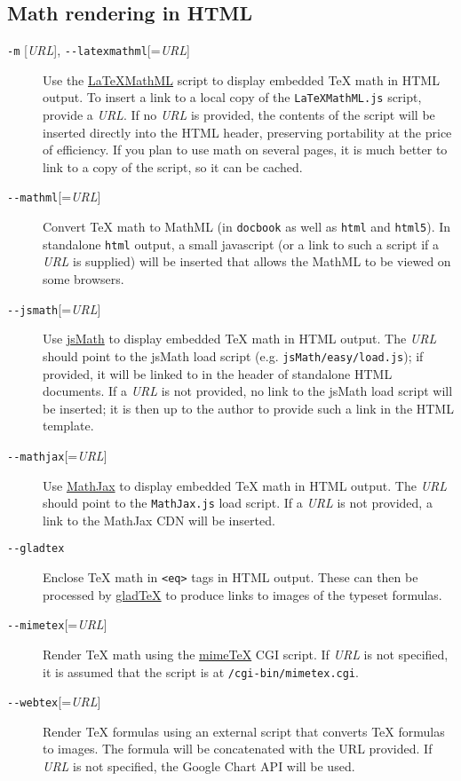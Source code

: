 \documentclass[]{article}
\begin{document}
\subsection{Math rendering in HTML}\label{math-rendering-in-html}

\begin{description}
\item[\texttt{-m} {[}\emph{URL}{]},
\texttt{-{}-latexmathml}{[}=\emph{URL}{]}]
Use the \href{http://math.etsu.edu/LaTeXMathML/}{LaTeXMathML} script to
display embedded TeX math in HTML output. To insert a link to a local
copy of the \texttt{LaTeXMathML.js} script, provide a \emph{URL}. If no
\emph{URL} is provided, the contents of the script will be inserted
directly into the HTML header, preserving portability at the price of
efficiency. If you plan to use math on several pages, it is much better
to link to a copy of the script, so it can be cached.
\item[\texttt{-{}-mathml}{[}=\emph{URL}{]}]
Convert TeX math to MathML (in \texttt{docbook} as well as \texttt{html}
and \texttt{html5}). In standalone \texttt{html} output, a small
javascript (or a link to such a script if a \emph{URL} is supplied) will
be inserted that allows the MathML to be viewed on some browsers.
\item[\texttt{-{}-jsmath}{[}=\emph{URL}{]}]
Use \href{http://www.math.union.edu/~dpvc/jsmath/}{jsMath} to display
embedded TeX math in HTML output. The \emph{URL} should point to the
jsMath load script (e.g. \texttt{jsMath/easy/load.js}); if provided, it
will be linked to in the header of standalone HTML documents. If a
\emph{URL} is not provided, no link to the jsMath load script will be
inserted; it is then up to the author to provide such a link in the HTML
template.
\item[\texttt{-{}-mathjax}{[}=\emph{URL}{]}]
Use \href{http://www.mathjax.org/}{MathJax} to display embedded TeX math
in HTML output. The \emph{URL} should point to the \texttt{MathJax.js}
load script. If a \emph{URL} is not provided, a link to the MathJax CDN
will be inserted.
\item[\texttt{-{}-gladtex}]
Enclose TeX math in \texttt{\textless{}eq\textgreater{}} tags in HTML
output. These can then be processed by
\href{http://ans.hsh.no/home/mgg/gladtex/}{gladTeX} to produce links to
images of the typeset formulas.
\item[\texttt{-{}-mimetex}{[}=\emph{URL}{]}]
Render TeX math using the
\href{http://www.forkosh.com/mimetex.html}{mimeTeX} CGI script. If
\emph{URL} is not specified, it is assumed that the script is at
\texttt{/cgi-bin/mimetex.cgi}.
\item[\texttt{-{}-webtex}{[}=\emph{URL}{]}]
Render TeX formulas using an external script that converts TeX formulas
to images. The formula will be concatenated with the URL provided. If
\emph{URL} is not specified, the Google Chart API will be used.
\end{description}
\end{document}
